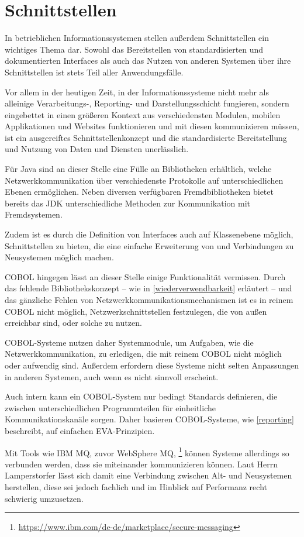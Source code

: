 \section{Schnittstellen}\label{schnittstellen}

In betrieblichen Informationssystemen stellen außerdem Schnittstellen ein wichtiges Thema dar. Sowohl das Bereitstellen von standardisierten und dokumentierten Interfaces als auch das Nutzen von anderen Systemen über ihre Schnittstellen ist stets Teil aller Anwendungsfälle. 

Vor allem in der heutigen Zeit, in der Informationssysteme nicht mehr als alleinige Verarbeitungs-, Reporting- und Darstellungsschicht fungieren, sondern eingebettet in einen größeren Kontext aus verschiedensten Modulen, mobilen Applikationen und Websites funktionieren und mit diesen kommunizieren müssen, ist ein ausgereiftes Schnittstellenkonzept und die standardisierte Bereitstellung und Nutzung von Daten und Diensten unerlässlich.

Für Java sind an dieser Stelle eine Fülle an Bibliotheken erhältlich, welche Netzwerkkommunikation über verschiedenste Protokolle auf unterschiedlichen Ebenen ermöglichen. Neben diversen verfügbaren Fremdbibliotheken bietet bereits das JDK unterschiedliche Methoden zur Kommunikation mit Fremdsystemen.

Zudem ist es durch die Definition von Interfaces auch auf Klassenebene möglich, Schnittstellen zu bieten, die eine einfache Erweiterung von und Verbindungen zu Neusystemen möglich machen.

COBOL hingegen lässt an dieser Stelle einige Funktionalität vermissen. Durch das fehlende Bibliothekskonzept -- wie in \autoref{wiederverwendbarkeit} erläutert -- und das gänzliche Fehlen von Netzwerkkommunikationsmechanismen ist es in reinem COBOL nicht möglich, Netzwerkschnittstellen festzulegen, die von außen erreichbar sind, oder solche zu nutzen. 

COBOL-Systeme nutzen daher \idR Systemmodule, um Aufgaben, wie die Netzwerkkommunikation, zu erledigen, die mit reinem COBOL nicht möglich oder aufwendig sind. Außerdem erfordern diese Systeme nicht selten Anpassungen in anderen Systemen, auch wenn es nicht sinnvoll erscheint.

Auch intern kann ein COBOL-System nur bedingt Standards definieren, die zwischen unterschiedlichen Programmteilen für einheitliche Kommunikationskanäle sorgen. Daher basieren COBOL-Systeme, wie \autoref{reporting} beschreibt, auf einfachen EVA-Prinzipien. 

Mit Tools wie IBM MQ, zuvor WebSphere MQ, \footnote{\url{https://www.ibm.com/de-de/marketplace/secure-messaging} \visitedOn} können Systeme allerdings so verbunden werden, dass sie miteinander kommunizieren können. Laut Herrn Lamperstorfer lässt sich damit  eine Verbindung zwischen Alt- und Neusystemen herstellen, diese sei jedoch fachlich und im Hinblick auf Performanz recht schwierig umzusetzen.


